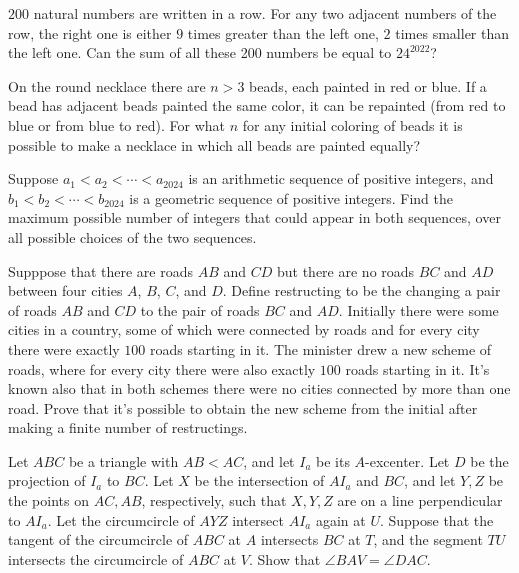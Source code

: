 \documentclass[11pt]{scrartcl}
\begin{document}
\begin{problem}[6135851041251773220]
$200$ natural numbers are written in a row. For any two adjacent numbers of the row, the right one is either $9$ times greater than the left one, $2$ times smaller than the left one. Can the sum of all these 200 numbers be equal to $24^{2022}$?
\end{problem}
\begin{problem}[6975633259976638169]
On the round necklace there are $n> 3$ beads, each painted in red or blue. If a bead has adjacent beads painted the same color, it can be repainted (from red to blue or from blue to red). For what $n$ for any initial coloring of beads it is possible to make a necklace in which all beads are painted equally?
\end{problem}
\begin{problem}[12311699525330]
	Suppose $a_{1} < a_{2}< \cdots < a_{2024}$ is an arithmetic sequence of positive integers, and $b_{1} <b_{2} < \cdots <b_{2024}$ is a geometric sequence of positive integers. Find the maximum possible number of integers that could appear in both sequences, over all possible choices of the two sequences.
\end{problem}
\begin{problem}[4875666253256352039]
Supppose that there are roads $AB$ and $CD$ but there are no roads $BC$ and $AD$ between four cities $A$, $B$, $C$, and $D$. Define restructing to be the changing a pair of roads $AB$ and $CD$ to the pair of roads $BC$ and $AD$. Initially there were some cities in a country, some of which were connected by roads and for every city there were exactly $100$ roads starting in it. The minister drew a new scheme of roads, where for every city there were also exactly $100$ roads starting in it. It's known also that in both schemes there were no cities connected by more than one road.
Prove that it's possible to obtain the new scheme from the initial after making a finite number of restructings.
\end{problem}
\begin{problem}[7017112574129036660]
	Let $ABC$ be a triangle with $AB<AC$, and let $I_a$ be its $A$-excenter. Let $D$ be the projection of $I_a$ to $BC$. Let $X$ be the intersection of $AI_a$ and $BC$, and let $Y,Z$ be the points on $AC,AB$, respectively, such that $X,Y,Z$ are on a line perpendicular to $AI_a$. Let the circumcircle of $AYZ$ intersect $AI_a$ again at $U$. Suppose that the tangent of the circumcircle of $ABC$ at $A$ intersects $BC$ at $T$, and the segment $TU$ intersects the circumcircle of $ABC$ at $V$. Show that $\angle BAV=\angle DAC$.
\end{problem}
\end{document}
